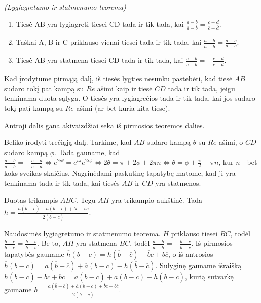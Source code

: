 \documentclass[11pt,a4paper,twoside]{book}
\begin{document}
\begin{thmnr}\textit{(Lygiagretumo ir statmenumo teorema)}\
\begin{enumerate}
\item Tiesė AB yra lygiagreti tiesei CD tada ir tik tada, kai $\frac{a - b}{\overline{a} -\overline{b}}=\frac{c - d}{\overline{c} - \overline{d}}$.
\item Taškai A, B ir C priklauso vienai tiesei tada ir tik tada, kai $\frac{a - b}{\overline{a} -\overline{b}}=\frac{a-c}{\overline{a} - \overline{c}}$.
\item Tiesė AB yra statmena tiesei CD tada ir tik tada, kai $\frac{a - b}{\overline{a} -\overline{b}}=-\frac{c - d}{\overline{c} - \overline{d}}$.
\end{enumerate}
\end{thmnr}
\begin{sprendimas} Kad įrodytume pirmąją dalį, iš tiesės lygties nesunku pastebėti, kad tiesė $AB$ sudaro tokį pat kampą su $Re$ ašimi kaip ir tiesė $CD$ tada ir tik tada, jeigu tenkinama duota sąlyga. O tiesės yra lygiagrečios tada ir tik tada, kai jos sudaro tokį patį kampą su $Re$ ašimi (ar bet kuria kita tiese).

Antroji dalis gana akivaizdžiai seka iš pirmosios teoremos dalies.

Beliko įrodyti trečiąją dalį. Tarkime, kad $AB$ sudaro kampą $\theta$ su $Re$ ašimi, o $CD$ sudaro kampą $\phi$. Tada gauname, kad $\frac{a - b}{\overline{a} -\overline{b}}=-\frac{c - d}{\overline{c} - \overline{d}} \Leftrightarrow e^{2i\theta}=e^{i\pi}e^{2i\phi} \Leftrightarrow 2\theta = \pi + 2\phi + 2\pi n \Leftrightarrow \theta = \phi + \frac{\pi}{2} + \pi n $, kur $n$ - bet koks sveikas skaičius. Nagrinėdami paskutinę tapatybę matome, kad ji yra tenkinama tada ir tik tada, kai tiesės $AB$ ir $CD$ yra statmenos.
\end{sprendimas}

\begin{pavnr}
Duotas trikampis $ABC$. Tegu $AH$ yra trikampio aukštinė. Tada $h=\frac{a(\overline{b}-\overline{c})+\overline{a}(b-c)+\overline{b}c-b\overline{c}}{2(\overline{b}-\overline{c})}.$
\end{pavnr}
\begin{sprendimas}
Naudosimės lygiagretumo ir statmenumo teorema. $H$ priklauso tiesei $BC$, todėl $\frac{b - c}{\overline{b} -\overline{c}}=\frac{h-b}{\overline{h} - \overline{b}}$. Be to, $AH$ yra statmena $BC$, todėl $\frac{a - h}{\overline{a} -\overline{h}}=-\frac{b - c}{\overline{b} - \overline{c}}$. Iš pirmosios tapatybės gauname $\overline{h}(b-c)=h(\overline{b} - \overline{c}) - \overline{b}c+b\overline{c}$, o iš antrosios $\overline{h}(b-c)=a(\overline{b}-\overline{c})+\overline{a}(b-c)-h(\overline{b}-\overline{c})$. Sulyginę gauname išraišką $h(\overline{b} - \overline{c}) - \overline{b}c+b\overline{c}=a(\overline{b}-\overline{c})+\overline{a}(b-c)-h(\overline{b}-\overline{c})$, kurią sutvarkę gauname $h=\frac{a(\overline{b}-\overline{c})+\overline{a}(b-c)+\overline{b}c-b\overline{c}}{2(\overline{b}-\overline{c})}$.
\end{sprendimas}
\end{document}
